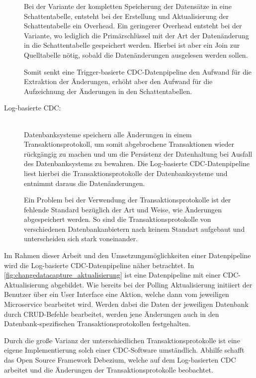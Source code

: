 \begin{description}
    Bei der Variante der kompletten Speicherung der Datensätze in eine Schattentabelle, entsteht bei der Erstellung und Aktualisierung der Schattentabelle ein Overhead. Ein geringerer Overhead entsteht bei der Variante, wo lediglich die Primärschlüssel mit der Art der Datenänderung in die Schattentabelle gespeichert werden. Hierbei ist aber ein Join zur Quelltabelle nötig, sobald die Datenänderungen ausgelesen werden sollen.

    Somit senkt eine Trigger-basierte CDC-Datenpipeline den Aufwand für die Extraktion der Änderungen, erhöht aber den Aufwand für die Aufzeichnung der Änderungen in den Schattentabellen.

    \item[Log-basierte CDC:]\hfill \\
    Datenbanksysteme speichern alle Änderungen in einem Transaktionsprotokoll, um somit abgebrochene Transaktionen wieder rückgängig zu machen und um die Persistenz der Datenhaltung bei Ausfall des Datenbanksystems zu bewahren. Die Log-basierte CDC-Datenpipeline liest hierbei die Transaktionsprotokolle der Datenbanksysteme und entnimmt daraus die Datenänderungen.

    Ein Problem bei der Verwendung der Transaktionsprotokolle ist der fehlende Standard bezüglich der Art und Weise, wie Änderungen abgespeichert werden. So sind die Transaktionsprotokolle von verschiedenen Datenbankanbietern nach keinem Standart aufgebaut und unterscheiden sich stark voneinander.

\end{description}

Im Rahmen dieser Arbeit und den Umsetzungsmöglichkeiten einer Datenpipeline wird die Log-basierte CDC-Datenpipeline näher betrachtet. In \autoref{fig:changedatacapture_aktualisierung} ist eine Datenpipeline mit einer CDC-Aktualisierung abgebildet. Wie bereits bei der Polling Aktualisierung initiiert der Benutzer über ein User Interface eine Aktion, welche dann vom jeweiligen Microservice bearbeitet wird. Werden dabei die Daten der jeweiligen Datenbank durch CRUD-Befehle bearbeitet, werden jene Änderungen auch in den Datenbank-spezifischen Transaktionsprotokollen festgehalten.

Durch die große Varianz der unterschiedlichen Transaktionsprotokolle ist eine eigene Implementierung solch einer CDC-Software umständlich. Abhilfe schafft das Open Source Framework \glqq Debezium\grqq{}, welche auf dem Log-basierten CDC arbeitet und die Änderungen der Transaktionsprotokolle beobachtet.

